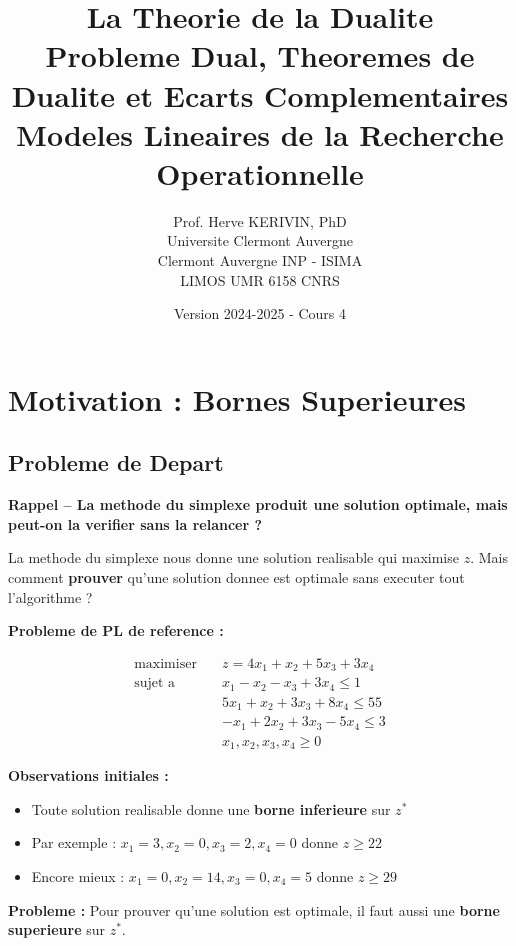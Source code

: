 \documentclass[12pt,a4paper]{article}
\title{\textbf{\Huge\color{titrebleu}La Theorie de la Dualite}\\[0.5em]
\large\color{defvert}Probleme Dual, Theoremes de Dualite et Ecarts Complementaires\\
\small Modeles Lineaires de la Recherche Operationnelle}
\author{\large Prof. Herve KERIVIN, PhD\\
\small Universite Clermont Auvergne\\
Clermont Auvergne INP - ISIMA\\
LIMOS UMR 6158 CNRS}
\date{\large Version 2024-2025 - Cours 4}
\begin{document}
\maketitle
\tableofcontents
\newpage

\section{Motivation : Bornes Superieures}

\subsection{Probleme de Depart}

\begin{notecours}
\textbf{Rappel -- La methode du simplexe produit une solution optimale, mais peut-on la verifier sans la relancer ?}

La methode du simplexe nous donne une solution realisable qui maximise $z$. Mais comment \textcolor{importantrouge}{\textbf{prouver}} qu'une solution donnee est optimale sans executer tout l'algorithme ?
\end{notecours}

\begin{exemple}
\textbf{Probleme de PL de reference :}

\begin{align*}
\text{maximiser} \quad & z = 4x_1 + x_2 + 5x_3 + 3x_4\\
\text{sujet a} \quad & x_1 - x_2 - x_3 + 3x_4 \leq 1\\
& 5x_1 + x_2 + 3x_3 + 8x_4 \leq 55\\
& -x_1 + 2x_2 + 3x_3 - 5x_4 \leq 3\\
& x_1, x_2, x_3, x_4 \geq 0
\end{align*}

\textbf{Observations initiales :}
\begin{itemize}
    \item Toute solution realisable donne une \textcolor{defvert}{\textbf{borne inferieure}} sur $z^*$
    \item Par exemple : $x_1 = 3, x_2 = 0, x_3 = 2, x_4 = 0$ donne $z \geq 22$
    \item Encore mieux : $x_1 = 0, x_2 = 14, x_3 = 0, x_4 = 5$ donne $z \geq 29$
\end{itemize}

\textbf{Probleme :} Pour prouver qu'une solution est optimale, il faut aussi une \textcolor{importantrouge}{\textbf{borne superieure}} sur $z^*$.
\end{exemple}
\end{document}
